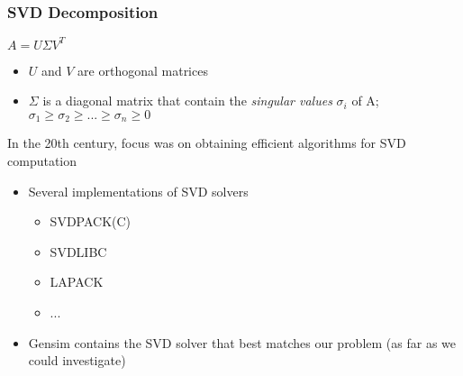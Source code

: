 \begin{frame} [plain]
\frametitle{SVD Decomposition}
\begin{block}{}
$A = U \Sigma V^{T}$
\begin{itemize}
  \item $U$ and $V$ are orthogonal matrices
  \item $\Sigma$ is a diagonal matrix that contain the \textit{singular values} $\sigma_i$ of
A; $\sigma_1 \geq \sigma_2 \geq ... \geq \sigma_n \geq 0$
\end{itemize}
\end{block}
\begin{block}{}
In the 20th century, focus was on obtaining efficient algorithms for SVD
computation
\begin{itemize}
  \item Several implementations of SVD solvers
  \begin{itemize}
    \item SVDPACK(C)
    \item SVDLIBC
    \item LAPACK
    \item ...
  \end{itemize}
  \item Gensim contains the SVD solver that best matches our problem (as far as we could investigate)
\end{itemize}
\end{block}
\end{frame}


